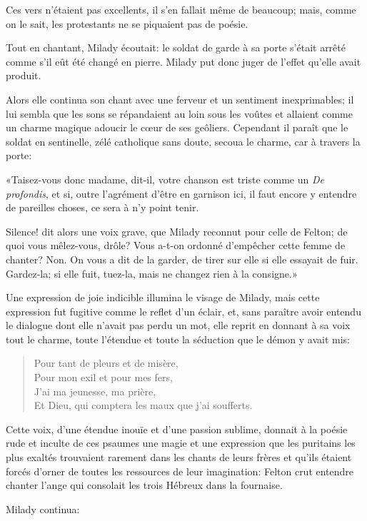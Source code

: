 Ces vers n'étaient pas excellents, il s'en fallait même de beaucoup; mais, comme on le sait, les protestants ne se piquaient pas de poésie. 

Tout en chantant, Milady écoutait: le soldat de garde à sa porte s'était arrêté comme s'il eût été changé en pierre. Milady put donc juger de l'effet qu'elle avait produit. 

Alors elle continua son chant avec une ferveur et un sentiment inexprimables; il lui sembla que les sons se répandaient au loin sous les voûtes et allaient comme un charme magique adoucir le cœur de ses geôliers. Cependant il paraît que le soldat en sentinelle, zélé catholique sans doute, secoua le charme, car à travers la porte: 

«Taisez-vous donc madame, dit-il, votre chanson est triste comme un \textit{De profondis}, et si, outre l'agrément d'être en garnison ici, il faut encore y entendre de pareilles choses, ce sera à n'y point tenir. 

\speak  Silence! dit alors une voix grave, que Milady reconnut pour celle de Felton; de quoi vous mêlez-vous, drôle? Vous a-t-on ordonné d'empêcher cette femme de chanter? Non. On vous a dit de la garder, de tirer sur elle si elle essayait de fuir. Gardez-la; si elle fuit, tuez-la, mais ne changez rien à la consigne.» 

Une expression de joie indicible illumina le visage de Milady, mais cette expression fut fugitive comme le reflet d'un éclair, et, sans paraître avoir entendu le dialogue dont elle n'avait pas perdu un mot, elle reprit en donnant à sa voix tout le charme, toute l'étendue et toute la séduction que le démon y avait mis:
\begin{verse}
Pour tant de pleurs et de misère,\\
Pour mon exil et pour mes fers,\\
J'ai ma jeunesse, ma prière,\\
Et Dieu, qui comptera les maux que j'ai soufferts. 
\end{verse}

Cette voix, d'une étendue inouïe et d'une passion sublime, donnait à la poésie rude et inculte de ces psaumes une magie et une expression que les puritains les plus exaltés trouvaient rarement dans les chants de leurs frères et qu'ils étaient forcés d'orner de toutes les ressources de leur imagination: Felton crut entendre chanter l'ange qui consolait les trois Hébreux dans la fournaise. 

Milady continua: 

